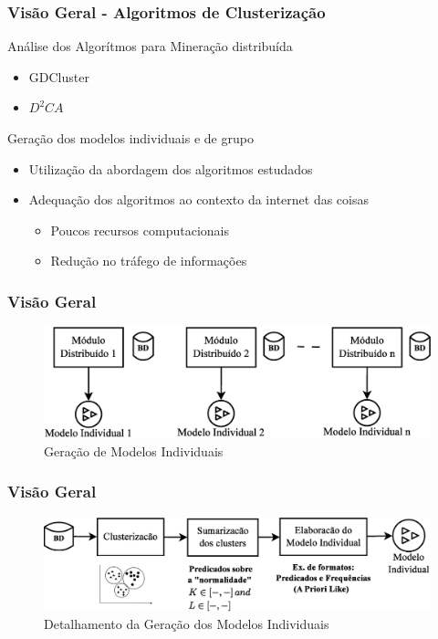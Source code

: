\documentclass[hyperref={pdfpagelabels=false}]{beamer}
\begin{document}
\begin{frame}
	\frametitle{Visão Geral - Algoritmos de Clusterização}
    Análise dos Algorítmos para Mineração distribuída
   
	\begin{itemize}
	    \item GDCluster \cite{001-000}
        \item $D^{2}CA$ \cite{017-000} 
    \end{itemize}
    
    Geração dos modelos individuais e de grupo \begin{itemize}
            \item Utilização da abordagem dos algoritmos estudados
            \item Adequação dos algoritmos ao contexto da internet das coisas \begin{itemize}
                    \item Poucos recursos computacionais
                    \item Redução no tráfego de informações
            \end{itemize}
    \end{itemize}
%       
\end{frame}
%
\begin{frame}
	\frametitle{Visão Geral}
    \begin{figure}
		\centering
	    \includegraphics[scale=0.35]{img/VisaoGeral-00}
  		\caption{\scriptsize{Geração de Modelos Individuais}}
   	\end{figure}
%
\end{frame}
%
\begin{frame}
	\frametitle{Visão Geral}
    \begin{figure}
		\centering
	    \includegraphics[scale=0.30]{img/VisaoGeral-01}
  		\caption{\scriptsize{Detalhamento da Geração dos Modelos Individuais}}
   	\end{figure}
\end{frame}
\end{document}

